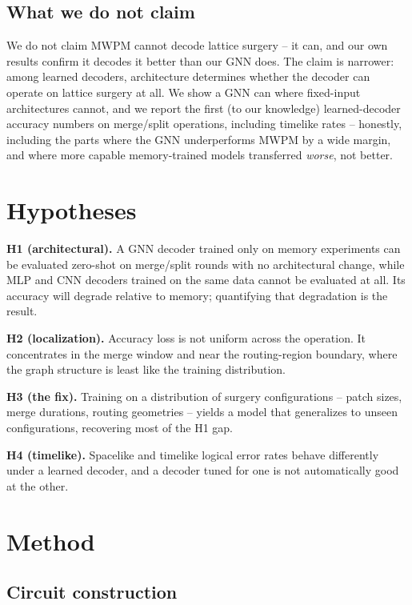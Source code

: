 \documentclass[11pt]{article}
\begin{document}
\subsection{What we do not claim}

We do not claim MWPM cannot decode lattice surgery -- it can, and our own
results confirm it decodes it better than our GNN does. The claim is
narrower: among learned decoders, architecture determines whether the
decoder can operate on lattice surgery at all. We show a GNN can where
fixed-input architectures cannot, and we report the first (to our knowledge)
learned-decoder accuracy numbers on merge/split operations, including
timelike rates -- honestly, including the parts where the GNN underperforms
MWPM by a wide margin, and where more capable memory-trained models
transferred \emph{worse}, not better.

\section{Hypotheses}

\textbf{H1 (architectural).} A GNN decoder trained only on memory experiments
can be evaluated zero-shot on merge/split rounds with no architectural
change, while MLP and CNN decoders trained on the same data cannot be
evaluated at all. Its accuracy will degrade relative to memory; quantifying
that degradation is the result.

\textbf{H2 (localization).} Accuracy loss is not uniform across the
operation. It concentrates in the merge window and near the routing-region
boundary, where the graph structure is least like the training distribution.

\textbf{H3 (the fix).} Training on a distribution of surgery configurations
-- patch sizes, merge durations, routing geometries -- yields a model that
generalizes to unseen configurations, recovering most of the H1 gap.

\textbf{H4 (timelike).} Spacelike and timelike logical error rates behave
differently under a learned decoder, and a decoder tuned for one is not
automatically good at the other.

\section{Method}

\subsection{Circuit construction}
\end{document}
